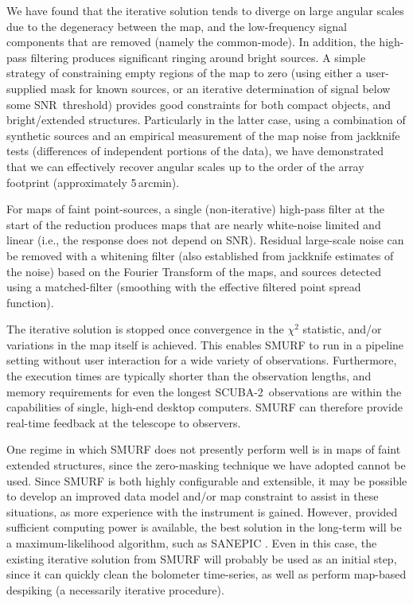 \documentclass[useAMS,usenatbib,nofootinbib]{mn2e}
\newcommand{\snr}{SNR}
\newcommand{\scuba}{SCUBA-2}
\begin{document}
We have found that the iterative solution tends to diverge on large
angular scales due to the degeneracy between the map, and the
low-frequency signal components that are removed (namely the
common-mode). In addition, the high-pass filtering produces
significant ringing around bright sources. A simple strategy of
constraining empty regions of the map to zero (using either a
user-supplied mask for known sources, or an iterative determination of
signal below some \snr\ threshold) provides good constraints for both
compact objects, and bright/extended structures. Particularly in the
latter case, using a combination of synthetic sources and an empirical
measurement of the map noise from jackknife tests (differences of
independent portions of the data), we have demonstrated that we can
effectively recover angular scales up to the order of the array
footprint (approximately 5\,arcmin).

For maps of faint point-sources, a single (non-iterative) high-pass
filter at the start of the reduction produces maps that are nearly
white-noise limited and linear (i.e., the response does not depend on
\snr). Residual large-scale noise can be removed with a whitening
filter (also established from jackknife estimates of the noise) based
on the Fourier Transform of the maps, and sources detected using a
matched-filter (smoothing with the effective filtered point spread
function).

The iterative solution is stopped once convergence in the $\chi^2$
statistic, and/or variations in the map itself is achieved. This
enables SMURF to run in a pipeline setting without user interaction
for a wide variety of observations. Furthermore, the execution times
are typically shorter than the observation lengths, and memory
requirements for even the longest \scuba\ observations are within the
capabilities of single, high-end desktop computers. SMURF can
therefore provide real-time feedback at the telescope to observers.

One regime in which SMURF does not presently perform well is in maps
of faint extended structures, since the zero-masking technique we have
adopted cannot be used. Since SMURF is both highly configurable and
extensible, it may be possible to develop an improved data model
and/or map constraint to assist in these situations, as more
experience with the instrument is gained. However, provided sufficient
computing power is available, the best solution in the long-term will
be a maximum-likelihood algorithm, such as SANEPIC
\citep{patanchon2008}. Even in this case, the existing iterative
solution from SMURF will probably be used as an initial step, since it
can quickly clean the bolometer time-series, as well as perform
map-based despiking (a necessarily iterative procedure).
\end{document}

